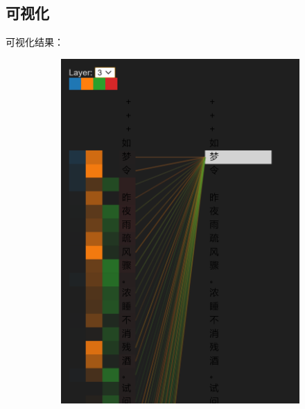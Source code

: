 \documentclass[a4paper]{article}
\begin{document}
\subsection{可视化}
可视化结果：
\begin{figure}[H]
    \centering
        \begin{subfigure}[b]{.45\linewidth}
            \includegraphics[width=\linewidth]{../img/3-1.png}
        \end{subfigure}
        \begin{subfigure}[b]{.5\linewidth}

\end{subfigure}
\end{figure}
\end{document}
